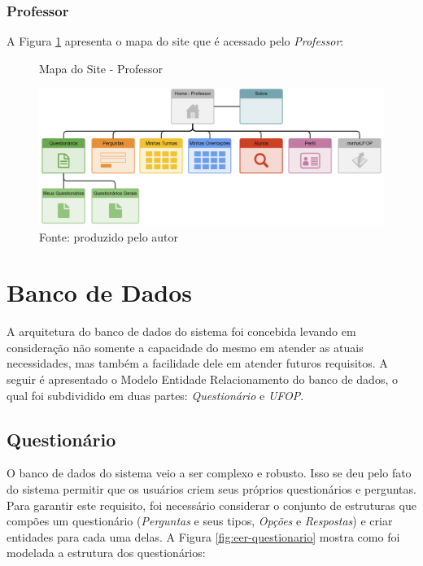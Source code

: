 \documentclass[
  12pt,       %
  openright,      %
  oneside,      %
  a4paper,      %
  english,      %
  french,        %
  spanish,     %
  brazil        %
  ]{abntex2-decsi}
\begin{document}
        \subsubsection{Professor}
        
        A Figura \ref{fig:websitemap_professor} apresenta o mapa do site que é acessado pelo \textit{Professor}:
		
        \begin{figure}[h]	
            \centering
            \caption{Mapa do Site - Professor}						   \label{fig:websitemap_professor}
            \includegraphics[width=1\textwidth]{img/websitemap_professor1}
            \caption*{Fonte: produzido pelo autor}
    	\end{figure}
    
    \newpage
    
\section{Banco de Dados}

A arquitetura do banco de dados do sistema foi concebida levando em consideração não somente a capacidade do mesmo em atender as atuais necessidades, mas também a facilidade dele em atender futuros requisitos. A seguir é apresentado o Modelo Entidade Relacionamento do banco de dados, o qual foi subdividido em duas partes: \textit{Questionário} e \textit{UFOP}.

	\subsection{Questionário}

    O banco de dados do sistema veio a ser complexo e robusto. Isso se deu pelo fato do sistema permitir que os usuários criem seus próprios questionários e perguntas. Para garantir este requisito, foi necessário considerar o conjunto de estruturas que compões um questionário (\textit{Perguntas} e seus tipos, \textit{Opções} e \textit{Respostas}) e criar entidades para cada uma delas. A Figura \ref{fig:eer-questionario} mostra como foi modelada a estrutura dos questionários:
\end{document}
